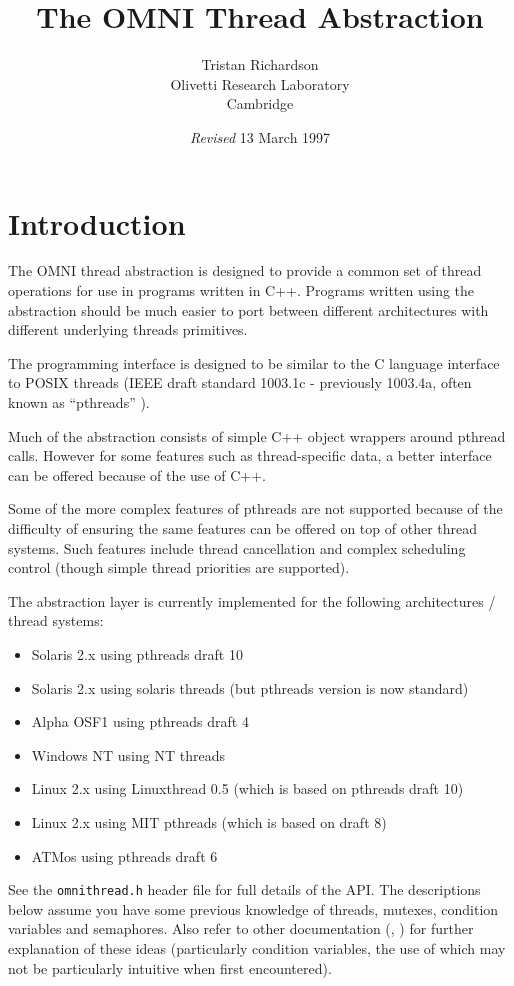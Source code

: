 \documentclass[11pt,twoside,onecolumn]{article}
\title{The OMNI Thread Abstraction}
\author{Tristan Richardson\\
Olivetti Research Laboratory \\
Cambridge \\
}
\date{{\it Revised} 13 March 1997}
\begin{document}
\maketitle

\section{Introduction}

The OMNI thread abstraction is designed to provide a common set of thread
operations for use in programs written in C++.  Programs written using the
abstraction should be much easier to port between different architectures with
different underlying threads primitives.

The programming interface is designed to be similar to the C language interface
to POSIX threads (IEEE draft standard 1003.1c - previously 1003.4a, often known
as ``pthreads'' \cite{pthreads}).

Much of the abstraction consists of simple C++ object wrappers around pthread
calls.  However for some features such as thread-specific data, a better
interface can be offered because of the use of C++.

Some of the more complex features of pthreads are not supported because of the
difficulty of ensuring the same features can be offered on top of other thread
systems.  Such features include thread cancellation and complex scheduling
control (though simple thread priorities are supported).

The abstraction layer is currently implemented for the following architectures
/ thread systems:

\begin{itemize}

\item Solaris 2.x using pthreads draft 10
\item Solaris 2.x using solaris threads (but pthreads version is now standard)
\item Alpha OSF1 using pthreads draft 4
\item Windows NT using NT threads
\item Linux 2.x using Linuxthread 0.5 (which is based on pthreads draft 10)
\item Linux 2.x using MIT pthreads (which is based on draft 8)
\item ATMos using pthreads draft 6

\end{itemize}

See the {\tt omnithread.h} header file for full details of the API.  The
descriptions below assume you have some previous knowledge of threads, mutexes,
condition variables and semaphores.  Also refer to other documentation
(\cite{birrell}, \cite{pthreads}) for further explanation of these ideas
(particularly condition variables, the use of which may not be particularly
intuitive when first encountered).
\end{document}
